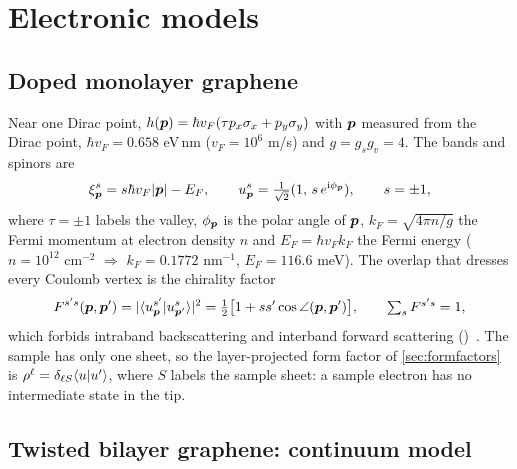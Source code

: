 \section{Electronic models}
\label{sec:models}

\subsection{Doped monolayer graphene}
\label{sec:slgmodel}

Near one Dirac point, $h(\bm p)=\hbar v_F(\tau p_x\sigma_x+p_y\sigma_y)$ with $\bm p$ measured from the Dirac
point, $\hbar v_F=0.658$ eV\,nm ($v_F=10^6$ m/s) and $g=g_sg_v=4$. The bands and spinors are
\begin{equation}
\xi^s_{\bm p}=s\hbar v_F|\bm p|-E_F,\qquad u^s_{\bm p}=\tfrac{1}{\sqrt2}(1,\,s\,e^{\mathrm i\phi_{\bm p}}),\qquad s=\pm1,
\end{equation}
where $\tau=\pm1$ labels the valley, $\phi_{\bm p}$ is the polar angle of $\bm p$, $k_F=\sqrt{4\pi n/g}$ the Fermi momentum at
electron density $n$ and $E_F=\hbar v_Fk_F$ the Fermi energy ($n=10^{12}$ cm$^{-2}$ $\Rightarrow$ $k_F=0.1772$ nm$^{-1}$,
$E_F=116.6$ meV). The overlap that dresses every Coulomb vertex is the chirality factor
\begin{equation}
F^{s's}(\bm p,\bm p')=|\langle u^{s'}_{\bm p}|u^{s}_{\bm p'}\rangle|^2=\tfrac12\bigl[1+ss'\cos\angle(\bm p,\bm p')\bigr],
\qquad \textstyle\sum_sF^{s's}=1,
\label{eq:chirality}
\end{equation}
which forbids intraband backscattering and interband forward scattering
()~\cite{CastroNeto2009,Kotov2012}. The sample has only one sheet,
so the layer-projected form factor of \cref{sec:formfactors} is $\rho^\ell=\delta_{\ell S}\langle u|u'\rangle$, where $S$ labels
the sample sheet: a sample electron has no intermediate state in the tip.

\subsection{Twisted bilayer graphene: continuum model}
\label{sec:tbgmodel}

